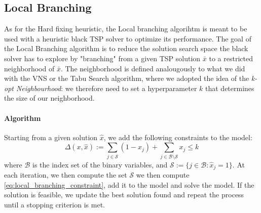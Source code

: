 \documentclass{article}
\begin{document}
\subsection{Local Branching}
As for the Hard fixing heuristic, the Local branching algorihtm is meant to be used with a heuristic black TSP solver to optimize its performance.
The goal of the Local Branching algorithm is to reduce the solution search space the black solver has to explore by "branching" from a given TSP solution $\bar{x}$ to a restricted neighborhood of $\bar{x}$.
The neighborhood is defined analougously to what we did with the VNS or the Tabu Search algorithm, where we adopted the idea of the \textit{k-opt Neighbourhood}: we therefore need to set a hyperparameter $k$
that determines the size of our neighborhood\cite{Fischetti2003LocalBranching}.

\paragraph{Algorithm}
Starting from a given solution $\hat{x}$, we add the following constraints to the model:
\begin{equation}
	\Delta(x , \hat{x}) := \sum_{j \in \mathcal{S}} (1 - x_j) + \sum_{j \in \mathcal{B} \setminus \mathcal{S}} x_j \leq k
	\label{eq:local_branching_constraint}
\end{equation} 
where $\mathcal{B}$ is the index set of the binary variables, and $\mathcal{S} := \{ j \in \mathcal{B} : \hat{x}_j = 1\}$\cite{Fischetti2003LocalBranching}.  
At each iteration, we then compute the set $\mathcal{S}$ we then compute \ref{eq:local_branching_constraint}, add it to the model and solve the model.
If the solution is feasible, we update the best solution found and repeat the process until a stopping criterion is met.
\end{document}
